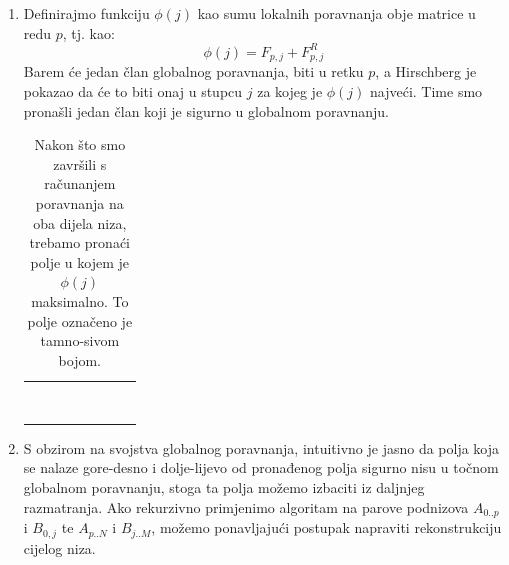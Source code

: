 \documentclass[times, utf8, zavrsni]{fer}
\begin{document}
\begin{enumerate}
\item
Definirajmo funkciju $\phi(j)$ kao sumu lokalnih poravnanja obje matrice u redu
$p$, tj. kao:
$$ \phi(j) = F_{p,j} + F^{R}_{p,j} $$
Barem će jedan član globalnog poravnanja, biti u retku $p$, a Hirschberg
je pokazao da će to biti onaj u stupcu $j$ za kojeg je $\phi(j)$ najveći.
Time smo pronašli jedan član koji je sigurno u globalnom poravnanju. 

\begin{table}
\centering
\begin{tabularx}{160pt}{|R|R|R|R|R|R|R|R|}
 \hline
  &  &  &  &  &  &  &  \\ \hline
  &  &  &  &  &  &  &  \\ \hline
  &  &  &  &  &  &  &  \\ \hline
  &  &  &  &  &  &  &  \\ \hline
   &   &   &   &   &   &   &   \\ \hline
  &  &  &  &  &  &  &  \\ \hline
  &  &  &  &  &  &  &  \\ \hline
  &  &  &  &  &  &  &  \\ \hline
  &  &  &  &  &  &  &  \\ \hline
\end{tabularx}
\caption[TODO: smisli dobar naslov 2]{Nakon što smo završili s računanjem
poravnanja na oba dijela niza, trebamo pronaći polje u kojem je $\phi(j)$
maksimalno. To polje označeno je tamno-sivom bojom.}
\label{table:Halg:2}
\end{table}

\item
S obzirom na svojstva globalnog poravnanja, intuitivno je jasno da
polja koja se nalaze gore-desno i dolje-lijevo od pronađenog polja 
sigurno nisu u točnom globalnom poravnanju, stoga ta polja
možemo izbaciti iz daljnjeg razmatranja. Ako rekurzivno primjenimo
algoritam na parove podnizova $A_{0..p}$ i $B_{0,j}$ te $A_{p..N}$ i
$B_{j..M}$, možemo ponavljajući postupak napraviti rekonstrukciju
cijelog niza.


\end{enumerate}
\end{document}
